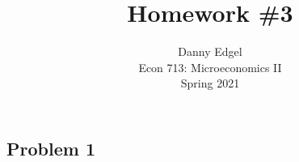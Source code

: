 \documentclass{article}
\begin{document}
\title{	Homework \#3 }
\author{ 	Danny Edgel 					\\ 
			Econ 713: Microeconomics II		\\
			Spring 2021						\\
		}
\maketitle\thispagestyle{empty}



\subsection*{Problem 1}
\end{document}
